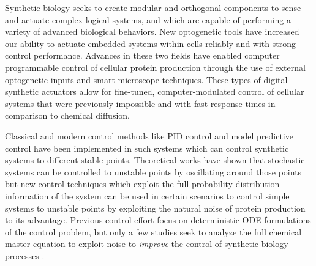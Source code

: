 \documentclass[12pt]{article}
\begin{document}
Synthetic biology seeks to create modular\cite{Ng2019} and orthogonal\cite{Liu2018} components to sense and actuate\cite{Sheets2020} complex logical systems\cite{Groseclose2020}, and which are capable of performing a variety of advanced biological behaviors\cite{Shin2020}. 
New optogenetic tools have increased our ability to actuate embedded systems within cells reliably and with strong control performance\cite{Sheets2020,Baumschlager2017,Chen2020,Lillacci2018}. Advances in these two fields have enabled computer programmable control of cellular protein production through the use of external optogenetic inputs and smart microscope techniques\cite{Fox2021,Baumschlager2021,Lugagne2017}. These types of digital-synthetic actuators allow for fine-tuned, computer-modulated control of cellular systems that were previously impossible\cite{Rullan2018, Baumschlager2017} and with fast response times in comparison to chemical diffusion. 

Classical and modern control methods like PID control and model predictive control have been implemented in such systems\cite{} which can control synthetic systems to different stable points. 
Theoretical works have shown that stochastic systems can be controlled to unstable points by oscillating around those points \cite{Guarino2020} but new control techniques which exploit the full probability distribution information of the system can be used in certain scenarios to control simple systems to unstable points by exploiting the natural noise of protein production to its advantage. Previous control effort focus on deterministic ODE formulations of the control problem, but only a few studies seek to analyze the full chemical master equation to exploit noise to {\em improve} the control of synthetic biology processes \cite{Szymanska2015,May2021}.  
\end{document}
